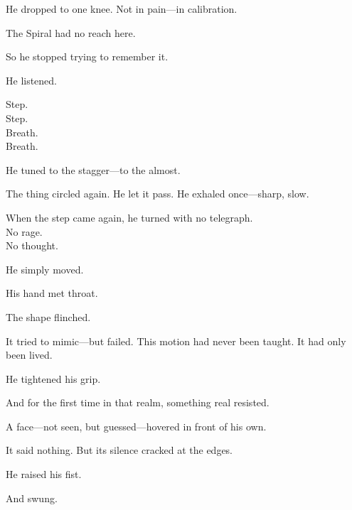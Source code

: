 \documentclass[12pt]{article}
\begin{document}
\vspace{0.5em}
He dropped to one knee. Not in pain---in calibration.

\vspace{0.5em}
The Spiral had no reach here.

\vspace{0.5em}
So he stopped trying to remember it.

\vspace{0.5em}
He listened.

\vspace{0.5em}
Step.\\
Step.\\
Breath.\\
Breath.

\vspace{0.5em}
He tuned to the stagger---to the almost.

\vspace{0.5em}
The thing circled again. He let it pass. He exhaled once---sharp, slow.

\vspace{0.5em}
When the step came again, he turned with no telegraph.\\
No rage.\\
No thought.

\vspace{0.5em}
He simply moved.

\vspace{0.5em}
His hand met throat.

\vspace{0.5em}
The shape flinched.

\vspace{0.5em}
It tried to mimic---but failed. This motion had never been taught. It had only been lived.

\vspace{0.5em}
He tightened his grip.

\vspace{0.5em}
And for the first time in that realm, something real resisted.

\vspace{0.5em}
A face---not seen, but guessed---hovered in front of his own.

\vspace{0.5em}
It said nothing. But its silence cracked at the edges.

\vspace{0.5em}
He raised his fist.

\vspace{0.5em}
And swung.
\end{document}

